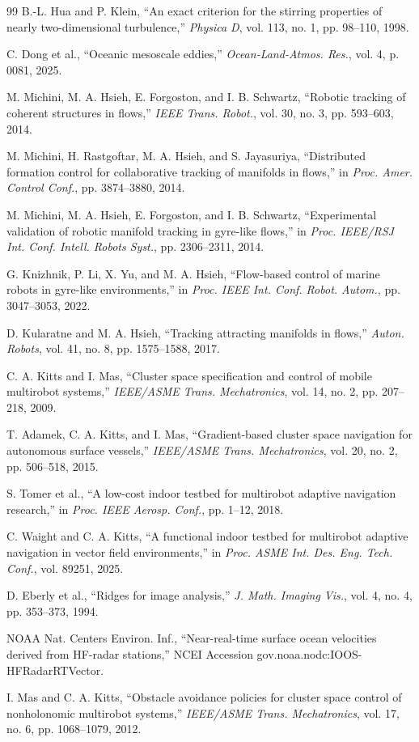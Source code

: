 \documentclass[lettersize,journal]{IEEEtran}
\begin{document}
\begin{thebibliography}{99}
 B.-L. Hua and P. Klein, ``An exact criterion for the stirring
properties of nearly two-dimensional turbulence,'' \textit{Physica D}, vol. 113,
no. 1, pp. 98--110, 1998.

 C. Dong et al., ``Oceanic mesoscale eddies,''
\textit{Ocean-Land-Atmos. Res.}, vol. 4, p. 0081, 2025.

 M. Michini, M. A. Hsieh, E. Forgoston, and I. B. Schwartz,
``Robotic tracking of coherent structures in flows,'' \textit{IEEE Trans.
Robot.}, vol. 30, no. 3, pp. 593--603, 2014.

 M. Michini, H. Rastgoftar, M. A. Hsieh, and S. Jayasuriya,
``Distributed formation control for collaborative tracking of manifolds in
flows,'' in \textit{Proc. Amer. Control Conf.}, pp. 3874--3880, 2014.

 M. Michini, M. A. Hsieh, E. Forgoston, and I. B. Schwartz,
``Experimental validation of robotic manifold tracking in gyre-like flows,''
in \textit{Proc. IEEE/RSJ Int. Conf. Intell. Robots Syst.},
pp. 2306--2311, 2014.

 G. Knizhnik, P. Li, X. Yu, and M. A. Hsieh, ``Flow-based control
of marine robots in gyre-like environments,'' in \textit{Proc. IEEE Int. Conf.
Robot. Autom.}, pp. 3047--3053, 2022.

 D. Kularatne and M. A. Hsieh, ``Tracking attracting manifolds in
flows,'' \textit{Auton. Robots}, vol. 41, no. 8, pp. 1575--1588, 2017.

 C. A. Kitts and I. Mas, ``Cluster space specification and control
of mobile multirobot systems,'' \textit{IEEE/ASME Trans. Mechatronics},
vol. 14, no. 2, pp. 207--218, 2009.

 T. Adamek, C. A. Kitts, and I. Mas, ``Gradient-based cluster space
navigation for autonomous surface vessels,'' \textit{IEEE/ASME Trans.
Mechatronics}, vol. 20, no. 2, pp. 506--518, 2015.

 S. Tomer et al., ``A low-cost indoor testbed for multirobot
adaptive navigation research,'' in \textit{Proc. IEEE Aerosp. Conf.},
pp. 1--12, 2018.

 C. Waight and C. A. Kitts, ``A functional indoor testbed for
multirobot adaptive navigation in vector field environments,'' in
\textit{Proc. ASME Int. Des. Eng. Tech. Conf.}, vol. 89251, 2025.

 D. Eberly et al., ``Ridges for image analysis,''
\textit{J. Math. Imaging Vis.}, vol. 4, no. 4, pp. 353--373, 1994.

 NOAA Nat. Centers Environ. Inf., ``Near-real-time surface
ocean velocities derived from HF-radar stations,'' NCEI Accession
gov.noaa.nodc:IOOS-HFRadarRTVector.

 I. Mas and C. A. Kitts, ``Obstacle avoidance policies for cluster
space control of nonholonomic multirobot systems,'' \textit{IEEE/ASME Trans.
Mechatronics}, vol. 17, no. 6, pp. 1068--1079, 2012.

\end{thebibliography}
\end{document}
